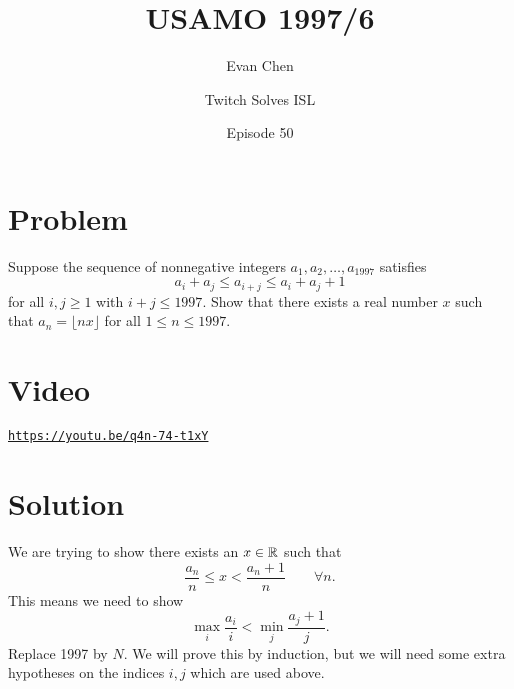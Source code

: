\documentclass[11pt]{scrartcl}
\begin{document}
\title{USAMO 1997/6}
\subtitle{Evan Chen}
\author{Twitch Solves ISL}
\date{Episode 50}
\maketitle

\section*{Problem}
Suppose the sequence of nonnegative integers
$a_1, a_2, \ldots, a_{1997}$ satisfies
\[ a_i + a_j \leq a_{i+j} \leq a_i + a_j + 1  \]
for all $i,j \geq 1$ with $i + j \leq 1997$.
Show that there exists a real number $x$ such that
$a_n = \lfloor nx \rfloor$ for all $1 \leq n \leq 1997$.

\section*{Video}
\href{https://www.youtube.com/watch?v=q4n-74-t1xY&list=PLi6h8GM1FA6yHh4gDk_ZYezmncU1EJUmZ}{\texttt{https://youtu.be/q4n-74-t1xY}}

\newpage

\section*{Solution}
We are trying to show there exists an $x \in \mathbb R$
such that
\[ \frac{a_n}{n} \le x < \frac{a_n+1}{n} \qquad \forall n. \]
This means we need to show
\[ \max_i \frac{a_i}{i} < \min_j \frac{a_j+1}{j}. \]
Replace 1997 by $N$.
We will prove this by induction,
but we will need some extra hypotheses on the indices $i,j$
which are used above.
\end{document}
